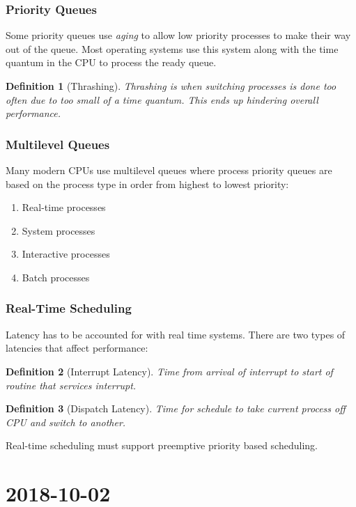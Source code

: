 \documentclass{report}
\newtheorem*{defn}{Definition}
\newcommand{\mychapter}[2]{
	\setcounter{chapter}{#1}
	\setcounter{section}{0}
	\chapter*{#2}
	\addcontentsline{toc}{chapter}{#2}
}
\begin{document}
\subsection*{Priority Queues}
Some priority queues use \textit{aging} to allow low priority processes to make their way out of the queue. Most operating systems use this system along with the time quantum in the CPU to process the ready queue.\\

\begin{defn}[Thrashing] Thrashing is when switching processes is done too often due to too small of a time quantum. This ends up hindering overall performance.
\end{defn}

\subsection*{Multilevel Queues}
Many modern CPUs use multilevel queues where process priority queues are based on the process type in order from highest to lowest priority:
\begin{enumerate}
	\item Real-time processes
	\item System processes
	\item Interactive processes
	\item Batch processes
\end{enumerate}

\subsection*{Real-Time Scheduling}
Latency has to be accounted for with real time systems. There are two types of latencies that affect performance:

\begin{defn}[Interrupt Latency]
	Time from arrival of interrupt to start of routine that services interrupt.
\end{defn}

\begin{defn}[Dispatch Latency]
	Time for schedule to take current process off CPU and switch to another.
\end{defn}

\noindent
Real-time scheduling must support preemptive priority based scheduling.

\mychapter{4}{2018-10-02}
\section*{}
\end{document}
